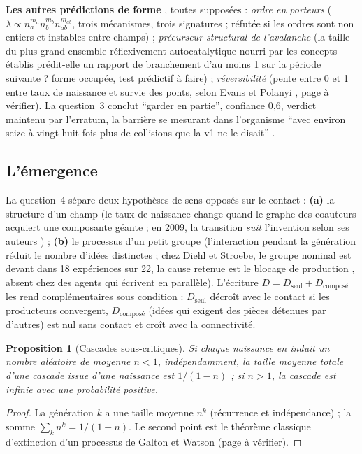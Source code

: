 \documentclass[11pt,a4paper]{article}
\theoremstyle{definition}
\theoremstyle{plain}
\newtheorem{proposition}[definition]{Proposition}
\begin{document}
\textbf{Les autres prédictions de forme} \cite[section~2]{q3}, toutes supposées :
\emph{ordre en porteurs} ($\lambda\propto n_a^{m_a}n_b^{m_b}n_{ab}^{m_{ab}}$, trois mécanismes, trois
signatures ; réfutée si les ordres sont non entiers et instables entre champs) ; \emph{précurseur
structural de l'avalanche} (la taille du plus grand ensemble réflexivement autocatalytique nourri
par les concepts établis \cite{hordijk2004} prédit-elle un rapport de branchement d'au moins 1 sur la
période suivante ? forme occupée, test prédictif à faire) ; \emph{réversibilité} (pente entre 0 et 1
entre taux de naissance et survie des ponts, selon Evans et Polanyi \cite{evanspolanyi1938}, page à
vérifier). La question~3 conclut \enquote{garder en partie}, confiance 0,6, verdict maintenu par
l'erratum, la barrière se mesurant dans l'organisme \enquote{avec environ seize à vingt-huit fois
plus de collisions que la v1 ne le disait} \cite{erratumq3}.

\subsection{L'émergence}

La question~4 sépare deux hypothèses de sens opposés sur le contact \cite[section~1]{q4} :
\textbf{(a)} la structure d'un champ (le taux de naissance change quand le graphe des coauteurs
acquiert une composante géante ; en 2009, la transition \emph{suit} l'invention selon ses auteurs
\cite[p.~5 et 14 du manuscrit]{bettencourt2009}) ; \textbf{(b)} le processus d'un petit groupe
(l'interaction pendant la génération réduit le nombre d'idées distinctes ; chez Diehl et Stroebe,
le groupe nominal est devant dans 18 expériences sur 22, la cause retenue est le blocage de
production \cite[p.~497]{diehlstroebe1987}, absent chez des agents qui écrivent en parallèle).
L'écriture $D=D_{\mathrm{seul}}+D_{\mathrm{composé}}$ les rend complémentaires sous condition :
$D_{\mathrm{seul}}$ décroît avec le contact si les producteurs convergent, $D_{\mathrm{composé}}$
(idées qui exigent des pièces détenues par d'autres) est nul sans contact et croît avec la
connectivité.

\begin{proposition}[Cascades sous-critiques]
\label{prop:branchement}
Si chaque naissance en induit un nombre aléatoire de moyenne $n<1$, indépendamment, la taille
moyenne totale d'une cascade issue d'une naissance est $1/(1-n)$ ; si $n>1$, la cascade est
infinie avec une probabilité positive.
\end{proposition}
\begin{proof}
La génération $k$ a une taille moyenne $n^k$ (récurrence et indépendance) ; la somme
$\sum_kn^k=1/(1-n)$. Le second point est le théorème classique d'extinction d'un processus de
Galton et Watson \cite[chapitre~I]{harris1963} (page à vérifier).
\end{proof}
\end{document}
